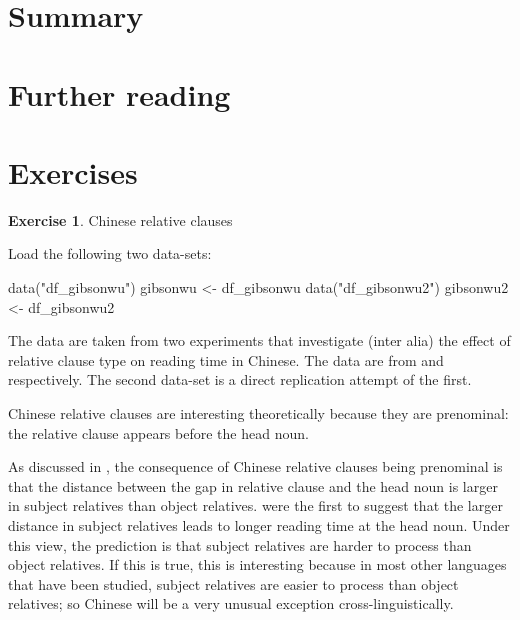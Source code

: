\documentclass[
  12pt,
]{krantz}
\newenvironment{Shaded}{\begin{snugshade}}{\end{snugshade}}
\newcommand{\FunctionTok}[1]{\textcolor[rgb]{0.00,0.00,0.00}{#1}}
\newcommand{\NormalTok}[1]{#1}
\newcommand{\OtherTok}[1]{\textcolor[rgb]{0.56,0.35,0.01}{#1}}
\newcommand{\StringTok}[1]{\textcolor[rgb]{0.31,0.60,0.02}{#1}}
\theoremstyle{definition}
\theoremstyle{definition}
\theoremstyle{definition}
\newtheorem{exercise}{Exercise}[chapter]
\theoremstyle{definition}
\theoremstyle{remark}
\begin{document}
\hypertarget{summary-3}{%
\section{Summary}\label{summary-3}}

\hypertarget{further-reading-2}{%
\section{Further reading}\label{further-reading-2}}

\hypertarget{sec:HypTestExercises}{%
\section{Exercises}\label{sec:HypTestExercises}}

\begin{exercise}
\protect\hypertarget{exr:HypTestExercisesChinese}{}\label{exr:HypTestExercisesChinese}Chinese relative clauses
\end{exercise}

Load the following two data-sets:

\begin{Shaded}
\begin{Highlighting}[]
\FunctionTok{data}\NormalTok{(}\StringTok{"df\_gibsonwu"}\NormalTok{)}
\NormalTok{gibsonwu }\OtherTok{\textless{}{-}}\NormalTok{ df\_gibsonwu}
\FunctionTok{data}\NormalTok{(}\StringTok{"df\_gibsonwu2"}\NormalTok{)}
\NormalTok{gibsonwu2 }\OtherTok{\textless{}{-}}\NormalTok{ df\_gibsonwu2}
\end{Highlighting}
\end{Shaded}

The data are taken from two experiments that investigate (inter alia) the effect of relative clause type on reading time in Chinese. The data are from \citet{gibsonwu} and \citet{VasishthetalPLoSOne2013} respectively. The second data-set is a direct replication attempt of the first.

Chinese relative clauses are interesting theoretically because they are prenominal: the relative clause appears before the head noun.

As discussed in \citet{gibsonwu}, the consequence of Chinese relative clauses being prenominal is that the distance between the gap in relative clause and the head noun is larger in subject relatives than object relatives. \citet{hsiao03} were the first to suggest that the larger distance in subject relatives leads to longer reading time at the head noun. Under this view, the prediction is that subject relatives are harder to process than object relatives. If this is true, this is interesting because in most other languages that have been studied, subject relatives are easier to process than object relatives; so Chinese will be a very unusual exception cross-linguistically.
\end{document}
